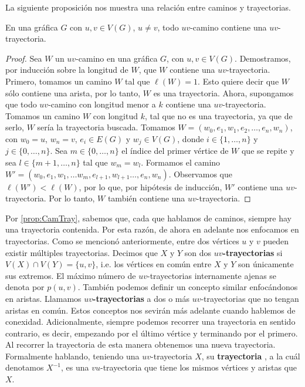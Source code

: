 La siguiente proposici\'on nos muestra una relaci\'on entre caminos y
trayectorias.

\begin{proposicion}
\label{prop:CamTray}
    En una gr\'afica $G$ con $u, v \in V(G)$, $u \ne v$, todo $uv$-camino
    contiene una $uv$-trayectoria.
\end{proposicion}

\begin{proof}
    Sea $W$ un $uv$-camino en una gr\'afica $G$, con $u,v \in V(G)$.
    Demostramos, por inducci\'on sobre la longitud de $W$, que $W$ contiene una
    $uv$-trayectoria. Primero, tomamos un camino $W$ tal que $\ell(W)=1$. Esto
    quiere decir que $W$ s\'olo contiene una arista, por lo tanto, $W$ es una
    trayectoria. Ahora, supongamos que todo $uv$-camino con longitud menor a $k$
    contiene una $uv$-trayectoria. Tomamos un camino $W$ con longitud $k$, tal
    que no es una trayectoria, ya que de serlo, $W$ ser\'ia la trayectoria
    buscada. Tomamos $W= (w_0,e_1,w_1,e_2, \dots, e_n,w_n)$, con $w_0=u$,
    $w_n=v$, $e_i \in E(G)$ y $w_j \in V(G)$, donde $i \in \{1, \dots, n\}$ y $j
    \in \{0, \dots, n\}$. Sea $m \in \{0, \dots, n\}$ el \'indice del primer
    v\'ertice de $W$ que se repite y sea $l \in \{m+1, \dots, n\}$ tal que $w_m
    = w_l$. Formamos el camino $W'= (w_0,e_1,w_1,\dots w_m, e_{l+1}, w_{l+1}
    \dots, e_n,w_n)$. Observamos que $\ell(W')<\ell(W)$, por lo que, por
    hip\'otesis de inducci\'on, $W'$ contiene una $uv$-trayectoria. Por lo
    tanto, $W$ tambi\'en contiene una $uv$-trayectoria.
\end{proof}

Por \cref{prop:CamTray}, sabemos que, cada que hablamos de caminos, siempre hay
una trayectoria contenida. Por esta raz\'on, de ahora en adelante nos enfocamos
en trayectorias. Como se mencion\'o anteriormente, entre dos v\'ertices $u$ y
$v$ pueden existir m\'ultiples trayectorias. Decimos que $X$ y $Y$ son dos
\textbf{$uv$-trayectorias} 
si $V(X)\cap V(Y)=\{u,v\}$, i.e. los v\'ertices en com\'un entre $X$ y $Y$ son
\'unicamente sus extremos. El m\'aximo n\'umero de $uv$-trayectorias
internamente ajenas se denota por $p(u,v)$. Tambi\'en podemos definir un
concepto similar enfoc\'andonos en aristas. Llamamos \textbf{$uv$-trayectorias}
 a dos o m\'as
$uv$-trayectorias que no tengan aristas en com\'un. Estos conceptos nos
sevir\'an m\'as adelante cuando hablemos de conexidad. Adicionalmente, siempre
podemos recorrer una trayectoria en sentido contrario, es decir, empezando por
el \'ultimo v\'ertice y terminando por el primero. Al recorrer la trayectoria de
esta manera obtenemos una nueva trayectoria. Formalmente hablando, teniendo una
$uv$-trayectoria $X$, su \textbf{trayectoria} ,
a la cu\'al denotamos $X^{-1}$, es una $vu$-trayectoria que tiene los mismos
v\'ertices y aristas que $X$.

